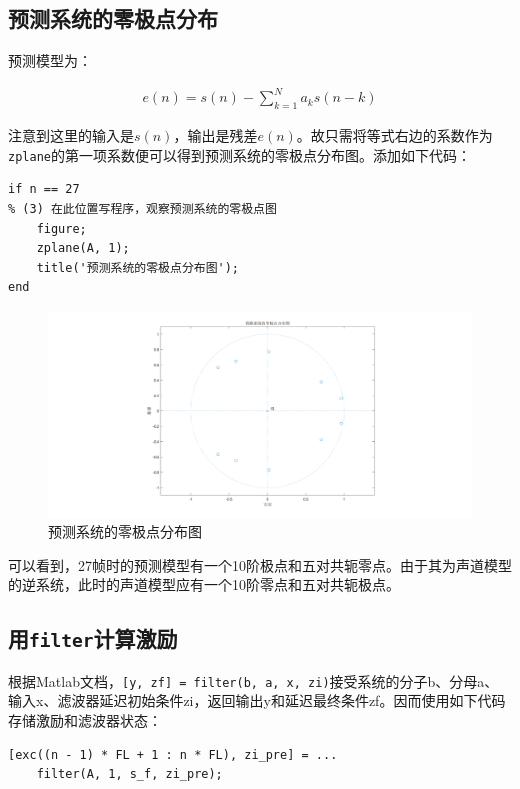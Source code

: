 \documentclass[10pt, a4paper]{article}
\begin{document}
\subsection{预测系统的零极点分布}

预测模型为：

\begin{align*}
    e(n) = s(n) - \sum_{k=1}^N a_k s(n - k)
\end{align*}

注意到这里的输入是$s(n)$，输出是残差$e(n)$。故只需将等式右边的系数作为\texttt{zplane}的第一项系数便可以得到预测系统的零极点分布图。添加如下代码：

\begin{verbatim}
if n == 27
% (3) 在此位置写程序，观察预测系统的零极点图
    figure;
    zplane(A, 1);
    title('预测系统的零极点分布图');
end
\end{verbatim}

\begin{figure}[h]
    \centering
    \includegraphics[width=.8\textwidth]{../assets/1_3_zplane.png}
    \caption{预测系统的零极点分布图}
    \label{fig:1_3_zplane}
\end{figure}

可以看到，27帧时的预测模型有一个10阶极点和五对共轭零点。由于其为声道模型的逆系统，此时的声道模型应有一个10阶零点和五对共轭极点。

\subsection{用\texttt{filter}计算激励}

根据Matlab文档，\texttt{[y, zf] = filter(b, a, x, zi)}接受系统的分子b、分母a、输入x、滤波器延迟初始条件zi，返回输出y和延迟最终条件zf。因而使用如下代码存储激励和滤波器状态：

\begin{verbatim}
[exc((n - 1) * FL + 1 : n * FL), zi_pre] = ...
    filter(A, 1, s_f, zi_pre);
\end{verbatim}
\end{document}
